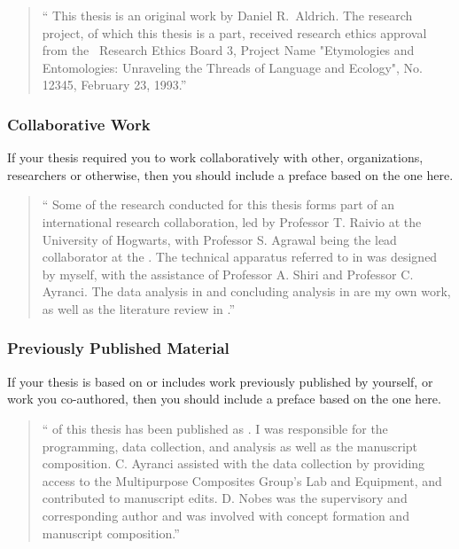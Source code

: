 				\begin{quote}
					\enquote{%
						This thesis is an original work by Daniel R.\ Aldrich. 
						The research project, of which this thesis is a part, received research ethics approval from the \University\ Research Ethics Board 3, Project Name "Etymologies and Entomologies: Unraveling the Threads of Language and Ecology", No. 12345, February 23, 1993.}%
				\end{quote}

			\subsubsection{Collaborative Work}\label{preface:CW}
				If your thesis required you to work collaboratively with other, organizations, researchers or otherwise, then you should include a preface based on the one here.

				\begin{quote}
					\enquote{%
						Some of the research conducted for this thesis forms part of an international research collaboration, led by Professor T. Raivio at the University of Hogwarts, with Professor S. Agrawal being the lead collaborator at the \University. 
						The technical apparatus referred to in  was designed by myself, with the assistance of Professor A. Shiri and Professor C. Ayranci. 
						The data analysis in  and concluding analysis in  are my own work, as well as the literature review in .}
				\end{quote}

			\subsubsection{Previously Published Material}\label{preface:PPW}
				If your thesis is based on or includes work previously published by yourself, or work you co-authored, then you should include a preface based on the one here.

				\begin{quote}
					\enquote{%
						 of this thesis has been published as . 
						I was responsible for the programming, data collection, and analysis as well as the manuscript composition. C. Ayranci assisted with the data collection by providing access to the Multipurpose Composites Group's Lab and Equipment, and contributed to manuscript edits. D. Nobes was the supervisory and corresponding author and was involved with concept formation and manuscript composition.}
				\end{quote}

